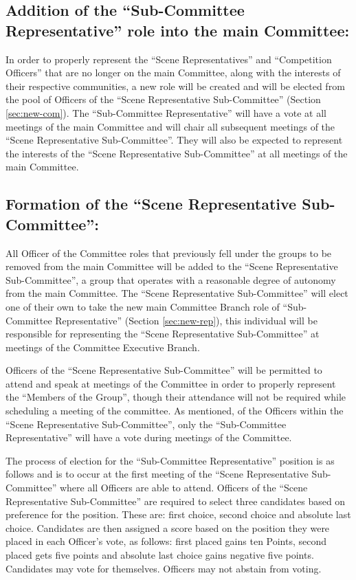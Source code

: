\documentclass[10pt, a4paper]{article}
\begin{document}
\subsection{Addition of the ``Sub-Committee Representative'' role into the main Committee: \label{sec:new-rep}}
In order to properly represent the ``Scene Representatives'' and ``Competition Officers'' that are no longer on the main Committee, along with the interests of their respective communities, a new role will be created and will be elected from the pool of Officers of the ``Scene Representative Sub-Committee'' (Section \ref{sec:new-com}). The ``Sub-Committee Representative'' will have a vote at all meetings of the main Committee and will chair all subsequent meetings of the ``Scene Representative Sub-Committee''. They will also be expected to represent the interests of the ``Scene Representative Sub-Committee'' at all meetings of the main Committee.

\subsection{Formation of the ``Scene Representative Sub-Committee'': \label{sec:new-com}}
All Officer of the Committee roles that previously fell under the groups to be removed from the main Committee will be added to the ``Scene Representative Sub-Committee'', a group that operates with a reasonable degree of autonomy from the main Committee. The ``Scene Representative Sub-Committee'' will elect one of their own to take the new main Committee Branch role of ``Sub-Committee Representative'' (Section \ref{sec:new-rep}), this individual will be responsible for representing the ``Scene Representative Sub-Committee'' at meetings of the Committee Executive Branch.

Officers of the ``Scene Representative Sub-Committee'' will be permitted to attend and speak at meetings of the Committee in order to properly represent the ``Members of the Group'', though their attendance will not be required while scheduling a meeting of the committee. As mentioned, of the Officers within the ``Scene Representative Sub-Committee'', only the ``Sub-Committee Representative'' will have a vote during meetings of the Committee.

The process of election for the ``Sub-Committee Representative'' position is as follows and is to occur at the first meeting of the ``Scene Representative Sub-Committee'' where all Officers are able to attend. Officers of the ``Scene Representative Sub-Committee'' are required to select three candidates based on preference for the position. These are: first choice, second choice and absolute last choice. Candidates are then assigned a score based on the position they were placed in each Officer's vote, as follows: first placed gains ten Points, second placed gets five points and absolute last choice gains negative five points. Candidates may vote for themselves. Officers may not abstain from voting.
\end{document}
